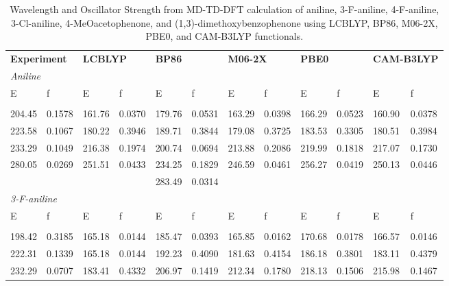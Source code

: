 \documentclass[
journal=jpcbfk, %
manuscript=article]{achemso}
\begin{document}
					\begin{table}[ht]
						\small
						\scriptsize
						\caption{Wavelength and Oscillator Strength from MD-TD-DFT calculation of aniline, 3-F-aniline, 4-F-aniline,
3-Cl-aniline, 4-MeOacetophenone, and (1,3)-dimethoxybenzophenone using LCBLYP, BP86, M06-2X, PBE0, and CAM-B3LYP functionals.}
						\label{Table:dataByFunctionals}
						\begin{tabular}[l]{llllllllllll}
							\multicolumn{2}{l}{\textbf{Experiment}} &										
							\multicolumn{2}{l}{\textbf{LCBLYP}} &
							\multicolumn{2}{l}{\textbf{BP86}} &
							\multicolumn{2}{l}{\textbf{M06-2X}} &
							\multicolumn{2}{l}{\textbf{PBE0}} & 
							\multicolumn{2}{l}{\textbf{CAM-B3LYP}} \\ 
							\multicolumn{10}{l}{\textit{Aniline}} \\ [1ex]
							E    & f    & E    & f    & E    & f    & E    & f    & E    & f    & E    & f \\ [0.5ex]
							\hline\hline
							\\[-0.5ex]
							204.45 &  0.1578 &  161.76 &  0.0370 &  179.76 &  0.0531 &  163.29 &  0.0398 &  166.29 &  0.0523 &  160.90 &  0.0378 \\
							223.58 &  0.1067 &  180.22 &  0.3946 &  189.71 &  0.3844 &  179.08 &  0.3725 &  183.53 &  0.3305 &  180.51 &  0.3984 \\
							233.29 &  0.1049 &  216.38 &  0.1974 &  200.74 &  0.0694 &  213.88 &  0.2086 &  219.99 &  0.1818 &  217.07 &  0.1730 \\
							280.05 &  0.0269 &  251.51 &  0.0433 &  234.25 &  0.1829 &  246.59 &  0.0461 &  256.27 &  0.0419 &  250.13 &  0.0446 \\
							~  & ~  & ~  & ~  &  283.49 &  0.0314 & ~  & ~  & ~  & ~  & ~  & \\ [1ex]
							\multicolumn{10}{l}{\textit{3-F-aniline}} \\ [1ex]
							E    & f    & E    & f    & E    & f    & E    & f    & E    & f    & E    & f \\ [0.5ex]
							\hline\hline
							\\[-0.5ex]
							198.42 &  0.3185 &  165.18 &  0.0144 &  185.47 &  0.0393 &  165.85 &  0.0162 &  170.68 &  0.0178 &  166.57 &  0.0146 \\
							222.31 &  0.1339 &  165.18 &  0.0144 &  192.23 &  0.4090 &  181.63 &  0.4154 &  186.18 &  0.3801 &  183.11 &  0.4379 \\
							232.29 &  0.0707 &  183.41 &  0.4332 &  206.97 &  0.1419 &  212.34 &  0.1780 &  218.13 &  0.1506 &  215.98 &  0.1467 \\

\end{tabular}
\end{table}
\end{document}
